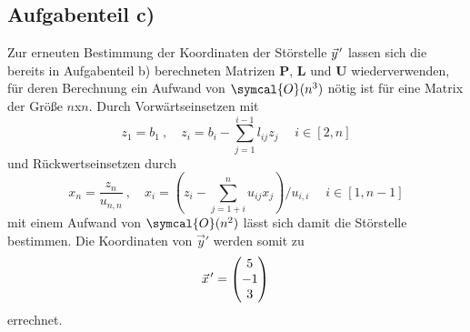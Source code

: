\subsection*{Aufgabenteil c)}
Zur erneuten Bestimmung der Koordinaten der Störstelle $\pvec{y}'$ lassen sich die bereits
in Aufgabenteil b) berechneten Matrizen $\symbf{P}$, $\symbf{L}$ und $\symbf{U}$ wiederverwenden, für deren Berechnung ein Aufwand von $\symcal{O}(n^3)$ nötig ist für eine Matrix der Größe $n$x$n$.
Durch Vorwärtseinsetzen mit
\begin{equation}
  z_1=b_1 \: , \quad z_i=b_i-\sum_{j=1}^{i-1}l_{ij}z_j\;\quad i \in [2,n]
\end{equation}
und Rückwertseinsetzen durch
\begin{equation}
  x_n=\frac{z_n}{u_{n,n}} \: , \quad x_i=(z_i-\sum_{j=1+i}^{n}u_{ij}x_j)/u_{i,i}\;\quad i \in [1,n-1]
\end{equation}
mit einem Aufwand von $\symcal{O}(n^2)$ %
lässt sich damit die Störstelle bestimmen.
Die Koordinaten von $\vec{y}'$ werden somit zu
\begin{equation*}
  \pvec{x}'=
  \begin{pmatrix}
    5 \\
    -1 \\
    3 \\
  \end{pmatrix} \\
\end{equation*}
errechnet.


